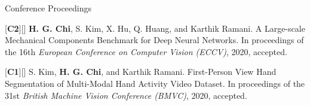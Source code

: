 


\begin{cventries}
\cvpub
{Conference Proceedings} %
{ %
\begin{cvitems}
\item {[\textbf{C2}][\href{https://docs.google.com/viewer?url=https://github.com/stnoah1/CV/raw/master/documents/MCB.pdf}{}] \textbf{H. G. Chi}, S. Kim, X. Hu, Q. Huang, and Karthik Ramani. A Large-scale Mechanical Components Benchmark for Deep Neural Networks. In proceedings of the 16th \textit{European Conference on Computer Vision (ECCV)}, 2020, accepted.}
\item {[\textbf{C1}][\href{https://docs.google.com/viewer?url=https://github.com/stnoah1/CV/raw/master/documents/RGBDT.pdf}{}] S. Kim, \textbf{H. G. Chi}, and Karthik Ramani. First-Person View Hand Segmentation of Multi-Modal Hand Activity Video Dataset. In proceedings of the 31st \textit{British Machine Vision Conference (BMVC)}, 2020, accepted.}
\end{cvitems}
}


\end{cventries}
